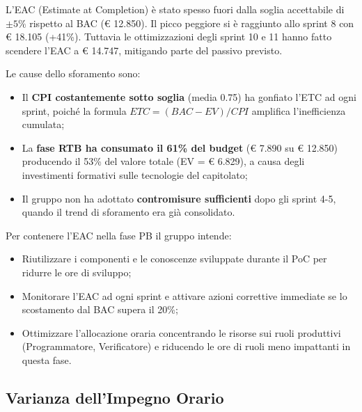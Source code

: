 \documentclass[a4paper,11pt,oneside]{scrartcl}
\begin{document}
L'EAC (Estimate at Completion) è stato spesso fuori dalla soglia accettabile di $\pm 5\%$ rispetto al BAC (\euro{} 12.850). Il picco peggiore si è raggiunto allo sprint 8 con \euro{} 18.105 (+41\%). Tuttavia le ottimizzazioni degli sprint 10 e 11 hanno fatto scendere l'EAC a \euro{} 14.747, mitigando parte del passivo previsto.

Le cause dello sforamento sono:
\begin{itemize}
    \item Il \textbf{CPI costantemente sotto soglia} (media 0.75) ha gonfiato l'ETC ad ogni sprint, poiché la formula $ETC = (BAC - EV) / CPI$ amplifica l'inefficienza cumulata;
    \item La \textbf{fase RTB ha consumato il 61\% del budget} (\euro{} 7.890 su \euro{} 12.850) producendo il 53\% del valore totale (EV = \euro{} 6.829), a causa degli investimenti formativi sulle tecnologie del capitolato;
    \item Il gruppo non ha adottato \textbf{contromisure sufficienti} dopo gli sprint 4-5, quando il trend di sforamento era già consolidato.
\end{itemize}

Per contenere l'EAC nella fase PB il gruppo intende:
\begin{itemize}
    \item Riutilizzare i componenti e le conoscenze sviluppate durante il PoC per ridurre le ore di sviluppo;
    \item Monitorare l'EAC ad ogni sprint e attivare azioni correttive immediate se lo scostamento dal BAC supera il 20\%;
    \item Ottimizzare l'allocazione oraria concentrando le risorse sui ruoli produttivi (Programmatore, Verificatore) e riducendo le ore di ruoli meno impattanti in questa fase.
\end{itemize}

\subsection{Varianza dell'Impegno Orario}
\end{document}

